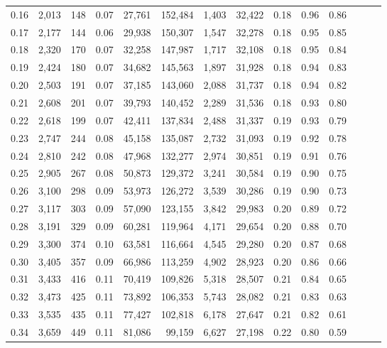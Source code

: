 \begin{tabular}{rrrrrrrrrrrrrr}
0.16 &  2,013 &  148 &  0.07 &   27,761 &  152,484 &   1,403 &  32,422 &  0.18 &  0.96 &      0.86 \\
0.17 &  2,177 &  144 &  0.06 &   29,938 &  150,307 &   1,547 &  32,278 &  0.18 &  0.95 &      0.85 \\
0.18 &  2,320 &  170 &  0.07 &   32,258 &  147,987 &   1,717 &  32,108 &  0.18 &  0.95 &      0.84 \\
0.19 &  2,424 &  180 &  0.07 &   34,682 &  145,563 &   1,897 &  31,928 &  0.18 &  0.94 &      0.83 \\
0.20 &  2,503 &  191 &  0.07 &   37,185 &  143,060 &   2,088 &  31,737 &  0.18 &  0.94 &      0.82 \\
0.21 &  2,608 &  201 &  0.07 &   39,793 &  140,452 &   2,289 &  31,536 &  0.18 &  0.93 &      0.80 \\
0.22 &  2,618 &  199 &  0.07 &   42,411 &  137,834 &   2,488 &  31,337 &  0.19 &  0.93 &      0.79 \\
0.23 &  2,747 &  244 &  0.08 &   45,158 &  135,087 &   2,732 &  31,093 &  0.19 &  0.92 &      0.78 \\
0.24 &  2,810 &  242 &  0.08 &   47,968 &  132,277 &   2,974 &  30,851 &  0.19 &  0.91 &      0.76 \\
0.25 &  2,905 &  267 &  0.08 &   50,873 &  129,372 &   3,241 &  30,584 &  0.19 &  0.90 &      0.75 \\
0.26 &  3,100 &  298 &  0.09 &   53,973 &  126,272 &   3,539 &  30,286 &  0.19 &  0.90 &      0.73 \\
0.27 &  3,117 &  303 &  0.09 &   57,090 &  123,155 &   3,842 &  29,983 &  0.20 &  0.89 &      0.72 \\
0.28 &  3,191 &  329 &  0.09 &   60,281 &  119,964 &   4,171 &  29,654 &  0.20 &  0.88 &      0.70 \\
0.29 &  3,300 &  374 &  0.10 &   63,581 &  116,664 &   4,545 &  29,280 &  0.20 &  0.87 &      0.68 \\
0.30 &  3,405 &  357 &  0.09 &   66,986 &  113,259 &   4,902 &  28,923 &  0.20 &  0.86 &      0.66 \\
0.31 &  3,433 &  416 &  0.11 &   70,419 &  109,826 &   5,318 &  28,507 &  0.21 &  0.84 &      0.65 \\
0.32 &  3,473 &  425 &  0.11 &   73,892 &  106,353 &   5,743 &  28,082 &  0.21 &  0.83 &      0.63 \\
0.33 &  3,535 &  435 &  0.11 &   77,427 &  102,818 &   6,178 &  27,647 &  0.21 &  0.82 &      0.61 \\
0.34 &  3,659 &  449 &  0.11 &   81,086 &   99,159 &   6,627 &  27,198 &  0.22 &  0.80 &      0.59 \\

\end{tabular}
